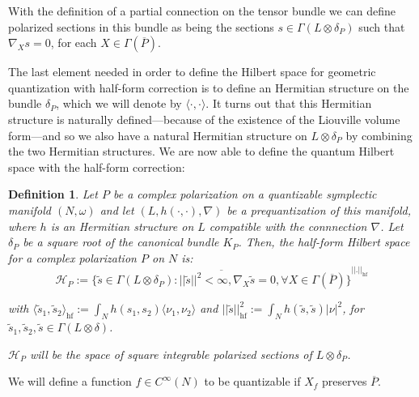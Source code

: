 \documentclass[a4paper,11pt]{article}
\newtheorem{definition}{Definition}
\begin{document}
With the definition of a partial connection on the tensor bundle we can define polarized sections in this bundle as being the sections $s\in\Gamma(L\otimes\delta_{P})$ such that $\nabla_{X}s=0$, for each $X\in\Gamma(\overline{P})$.\par
The last element needed in order to define the Hilbert space for geometric quantization with half-form correction is to define an Hermitian structure on the bundle $\delta_{P}$, which we will denote by $\langle\cdot,\cdot\rangle$. It turns out that this Hermitian structure is naturally defined---because of the existence of the Liouville volume form---and so we also have a natural Hermitian structure on $L\otimes \delta_{P}$ by combining the two Hermitian structures.
We are now able to define the quantum Hilbert space with the half-form correction:

\begin{definition}
Let $P$ be a complex polarization on a quantizable symplectic manifold $(N,\omega)$ and let $(L,h(\cdot,\cdot),\nabla)$ be a prequantization of this manifold, where $h$ is an Hermitian structure on $L$ compatible with the connnection $\nabla$. Let $\delta_{P}$ be a square root of the canonical bundle $K_{P}$. Then, the half-form Hilbert space for a complex polarization $P$ on $N$ is:
\begin{equation*}
    \mathcal{H}_{P} := \overline{\{\tilde{s}\in\Gamma(L\otimes\delta_{P}):||\tilde{s}||^2<\infty, \nabla_{X}\tilde{s}=0,\forall X\in\Gamma(\overline{P})\}}^{||.||_{\mathrm{hf}}}
\end{equation*}

with 
$\langle \tilde{s}_{1},\tilde{s}_{2}\rangle_{\mathrm{hf}} := \int_{N}h(s_{1},s_{2})\langle \nu_{1},\nu_{2}\rangle$ and $||\tilde{s}||^{2}_{\mathrm{hf}} := \int_{N}h(\tilde{s},\tilde{s})|\nu|^2$, for $\tilde{s}_{1},\tilde{s}_{2},\tilde{s}\in\Gamma(L\otimes\delta)$.\par
$\mathcal{H}_{P}$ will be the space of square integrable polarized sections of $L\otimes\delta_{P}$.
\end{definition}

We will define a function $f\in C^{\infty}(N)$ to be quantizable if $X_{f}$ preserves $\overline{P}$. 
\end{document}
